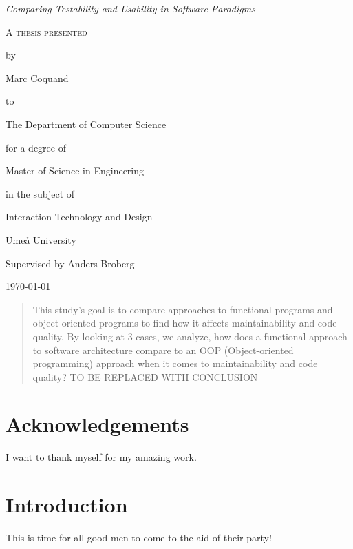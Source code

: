 \documentclass[12pt]{article}
\theoremstyle{definition}
\theoremstyle{theorem}
\begin{document}
\begin{titlepage}
	\centering
    \null
    \vfill
    {\Large\itshape Comparing Testability and Usability in Software Paradigms
    \par}
    \vspace{3.0cm}
	{\scshape 
    A thesis presented \par 
    by\par
	Marc Coquand\par
	to\par
    The Department of Computer Science\par
    \vspace{0.8cm}
	for a degree of\par
    Master of Science in Engineering\par
    in the subject of\par
    Interaction Technology and Design\par}
    \vfill
    Umeå University\par
    Supervised by Anders Broberg\par
	\today\par
\end{titlepage}
\clearpage
\thispagestyle{empty}

\clearpage\newpage
\thispagestyle{empty}

\begin{abstract} 

    This study's goal is to compare approaches to functional programs and
    object-oriented programs to find how it affects maintainability and code
    quality. By looking at 3 cases, we analyze, how does a functional approach
    to software architecture compare to an OOP (Object-oriented programming)
    approach when it comes to maintainability and code quality? TO BE REPLACED
    WITH CONCLUSION

\end{abstract}

\clearpage\newpage
\thispagestyle{empty}

\section*{Acknowledgements}

I want to thank myself for my amazing work.

\clearpage\newpage
\thispagestyle{empty}

\tableofcontents
\newpage

\section{Introduction}
This is time for all good men to come to the aid of their party!
\end{document}
